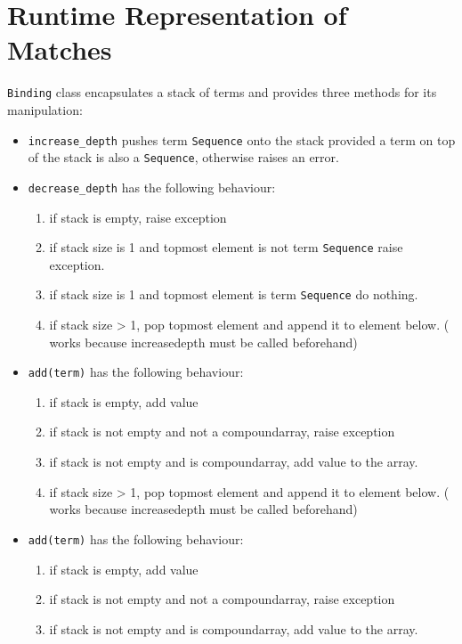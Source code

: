 \section{Runtime Representation of Matches}

\texttt{Binding} class encapsulates a stack of terms and provides three methods for its manipulation:

\begin{itemize}
\item 
\texttt{increase\_depth} pushes term \texttt{Sequence} onto the stack provided a term on top of the stack is also a \texttt{Sequence}, otherwise raises an error.

\item
\texttt{decrease\_depth} has the following behaviour:
	\begin{enumerate}
		\item
        if stack is empty, raise exception
		\item
		if stack size is 1 and topmost element is not term \texttt{Sequence} raise exception.
		\item
		if stack size is 1 and topmost element is term \texttt{Sequence} do nothing.
		\item
        if stack size > 1, pop topmost element and append it to element below. ( works because increasedepth must be called beforehand)
	\end{enumerate}

\item
\texttt{add(term)} has the following behaviour:
	\begin{enumerate}
		\item
         if stack is empty, add value
		\item
         if stack is not empty and not a compoundarray, raise exception
		\item
        if stack is not empty and is compoundarray, add value to the array.
		\item
        if stack size > 1, pop topmost element and append it to element below. ( works because increasedepth must be called beforehand)
	\end{enumerate}

\item
\texttt{add(term)} has the following behaviour:
	\begin{enumerate}
		\item
         if stack is empty, add value
		\item
         if stack is not empty and not a compoundarray, raise exception
		\item
        if stack is not empty and is compoundarray, add value to the array.
	\end{enumerate}
\end{itemize}



